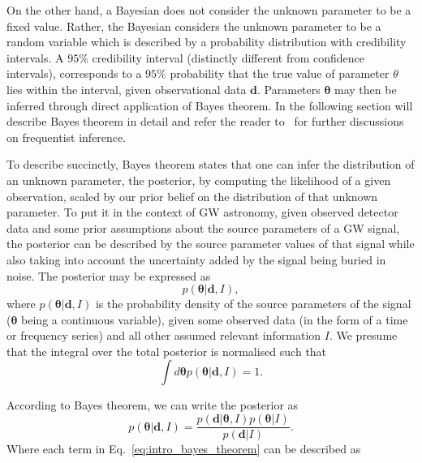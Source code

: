 On the other hand, a Bayesian does not consider the unknown parameter to 
be a fixed value. Rather, the Bayesian considers the unknown parameter 
to be a random variable which is described by a probability distribution 
with credibility 
intervals. A $95\%$ credibility interval (distinctly different 
from confidence intervals), 
corresponds to a $95\%$ probability that the true value of parameter $\theta$ 
lies within the interval, given 
observational data $\bm{d}$. Parameters $\bm{\theta}$ may then   
be inferred through direct application of Bayes theorem. In the following section 
will describe Bayes theorem in detail and refer the 
reader to~\cite{10.2307/91337} for further discussions on 
frequentist inference.

%
%
To describe succinctly, Bayes theorem states that one can 
infer the distribution of an 
unknown parameter, the posterior, by computing the likelihood of a 
given observation, scaled by our 
prior belief on the distribution of that unknown parameter. To put it 
in the context of \ac{GW} astronomy, given observed detector 
data and some prior assumptions about the source parameters of 
a \ac{GW} signal, the posterior can be described by 
the source parameter values of that signal while also taking into account the 
uncertainty added by the signal being buried in noise. The 
posterior may be expressed as
%
\begin{equation}
    p(\pmb{\theta} | \pmb{d}, I),
\end{equation}
%
where $p(\bm{\theta} | \bm{d}, I)$ is the probability density 
of the source parameters of the signal 
($\bm{\theta}$ being a continuous variable), given some observed data 
(in the form of a time or frequency series) and 
all other assumed relevant information $I$. We presume that the integral over 
the total posterior is normalised such that
%
%
%
\begin{equation}
    \int d\pmb{\theta} p(\bm{\theta} | \bm{d}, I) = 1.
\end{equation}
%

According to Bayes theorem, we can write the posterior as 
%
%
%
\begin{equation}
    p(\bm{\theta} | \bm{d}, I) = \frac{p(\bm{d}|\bm{\theta}, I)p(\bm{\theta}|I)}{p(\bm{d}|I)}.
\end{equation}\label{eq:intro_bayes_theorem}
%
%
%
Where each term in Eq.~\ref{eq:intro_bayes_theorem} can be described as 

